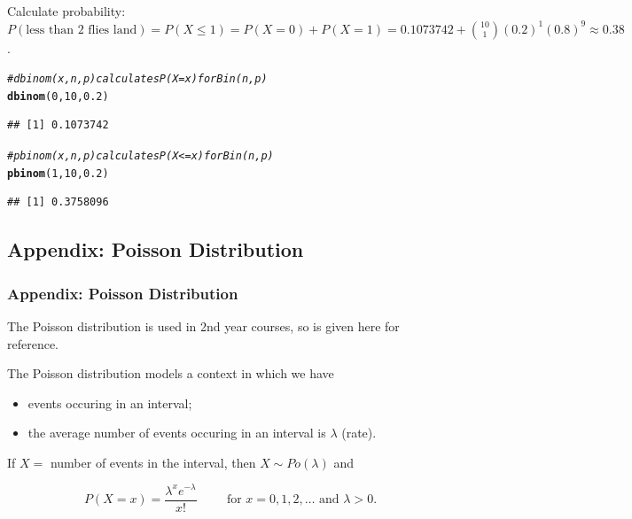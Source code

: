 \documentclass[t,xcolor=pdftex,dvipsnames,table]{beamer}\usepackage[]{graphicx}\usepackage[]{color}
\makeatletter
\newcommand{\hlnum}[1]{\textcolor[rgb]{0.686,0.059,0.569}{#1}}%
\newcommand{\hlcom}[1]{\textcolor[rgb]{0.678,0.584,0.686}{\textit{#1}}}%
\newcommand{\hlstd}[1]{\textcolor[rgb]{0.345,0.345,0.345}{#1}}%
\newcommand{\hlkwd}[1]{\textcolor[rgb]{0.737,0.353,0.396}{\textbf{#1}}}%
\newenvironment{kframe}{%
 \def\at@end@of@kframe{}%
 \ifinner\ifhmode%
  \def\at@end@of@kframe{\end{minipage}}%
  \begin{minipage}{\columnwidth}%
 \fi\fi%
 \def\FrameCommand##1{\hskip\@totalleftmargin \hskip-\fboxsep
 \colorbox{shadecolor}{##1}\hskip-\fboxsep
     \hskip-\linewidth \hskip-\@totalleftmargin \hskip\columnwidth}%
 \MakeFramed {\advance\hsize-\width
   \@totalleftmargin\z@ \linewidth\hsize
   \@setminipage}}%
 {\par\unskip\endMakeFramed%
 \at@end@of@kframe}
\newenvironment{knitrout}{}{} %
\makeatother
\begin{document}
\begin{frame}[fragile]\frametitle{}
\begin{block}{}
Calculate probability:  \\
$P(\mbox{less than 2 flies land}) = P(X \leq 1) = P(X=0) +P(X=1) = 0.1073742 + {10 \choose 1} (0.2)^1 (0.8)^9 \approx 0.38$.
\end{block}

\begin{knitrout}
\color{fgcolor}\begin{kframe}
\begin{alltt}
\hlcom{# dbinom(x,n,p) calculates P(X=x) for Bin(n,p)}
\hlkwd{dbinom}\hlstd{(}\hlnum{0}\hlstd{,}\hlnum{10}\hlstd{,}\hlnum{0.2}\hlstd{)}
\end{alltt}
\begin{verbatim}
## [1] 0.1073742
\end{verbatim}
\end{kframe}
\end{knitrout}

\begin{knitrout}
\color{fgcolor}\begin{kframe}
\begin{alltt}
\hlcom{# pbinom(x,n,p) calculates P(X<=x) for Bin(n,p)}
\hlkwd{pbinom}\hlstd{(}\hlnum{1}\hlstd{,}\hlnum{10}\hlstd{,}\hlnum{0.2}\hlstd{)}
\end{alltt}
\begin{verbatim}
## [1] 0.3758096
\end{verbatim}
\end{kframe}
\end{knitrout}
\end{frame}


\subsection{Appendix: Poisson Distribution}
\begin{frame}\frametitle{Appendix: Poisson Distribution}

The Poisson distribution is used in 2nd year courses, so is given here for reference.

\begin{definition}
The \alert{Poisson distribution} models a context in which we have
\begin{itemize}
\item events occuring in an interval; 
\item the average number of events occuring in an interval is $\lambda$ (rate).
\end{itemize}

\vspace{.5cm}
If $X =$ number of events in the interval, then $X \sim Po(\lambda)$ and

\[ P(X=x) =   \frac{ \lambda^x e^{-\lambda}}{x!} 
\hspace{1cm} \mbox{for } x=0,1,2,\ldots \mbox{ and } \lambda > 0. \]
\end{definition}
\end{frame}
\end{document}
